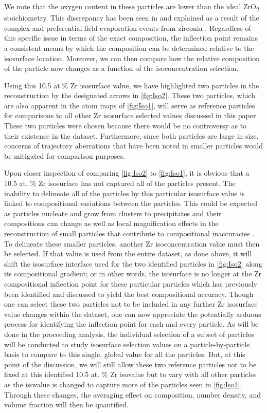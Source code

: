 		We note that the oxygen content in these particles are lower than the ideal ZrO\textsubscript{2} stoichiometry. This discrepancy has been seen in \cite{RN368} and explained as a result of the complex and preferential field evaporation events from zirconia \cite{RN807}. Regardless of this specific issue in terms of the exact composition, the inflection point remains a consistent means by which the composition can be determined relative to the isosurface location. Moreover, we can then compare how the relative composition of the particle now changes as a function of the isoconcentration selection.
		
		Using this 10.5 at.\% Zr isosurface value, we have highlighted two particles in the reconstruction by the designated arrows in \ref{fig:Iso2}. These two particles, which are also apparent in the atom maps of \ref{fig:Iso1}, will serve as reference particles for comparisons to all other Zr isosurface selected values discussed in this paper. These two particles were chosen because there would be no controversy as to their existence in the dataset. Furthermore, since both particles are large in size, concerns of trajectory aberrations that have been noted in smaller particles \cite{RN2620} would be mitigated for comparison purposes. 
		
		Upon closer inspection of comparing \ref{fig:Iso2} to \ref{fig:Iso1}, it is obvious that a 10.5 at. \% Zr isosurface has not captured all of the particles present. The inability to delineate all of the particles by this particular isosurface value is linked to compositional variations between the particles. This could be expected as particles nucleate and grow from clusters to precipitates and their compositions can change as well as local magnification effects in the reconstruction of small particles that contribute to compositional inaccuracies \cite{RN806}. To delineate these smaller particles, another Zr isoconcentration value must then be selected. If that value is used from the entire dataset, as done above, it will shift the isosurface interface used for the two identified particles in \ref{fig:Iso2} along its compositional gradient; or in other words, the isosurface is no longer at the Zr compositional inflection point for these particular particles which has previously been identified and discussed to yield the best compositional accuracy. Though one can select these two particles not to be included in any further Zr isosurface value changes within the dataset, one can now appreciate the potentially arduous process for identifying the inflection point for each and every particle. As will be done in the proceeding analysis, the individual selection of a subset of particles will be conducted to study isosurface selection values on a particle-by-particle basis to compare to this single, global value for all the particles. But, at this point of the discussion, we will still allow these two reference particles not to be fixed at this identified 10.5 at. \% Zr isovalue but to vary with all other particles as the isovalue is changed to capture more of the particles seen in \ref{fig:Iso1}. Through these changes, the averaging effect on composition, number density, and volume fraction will then be quantified. 
		
